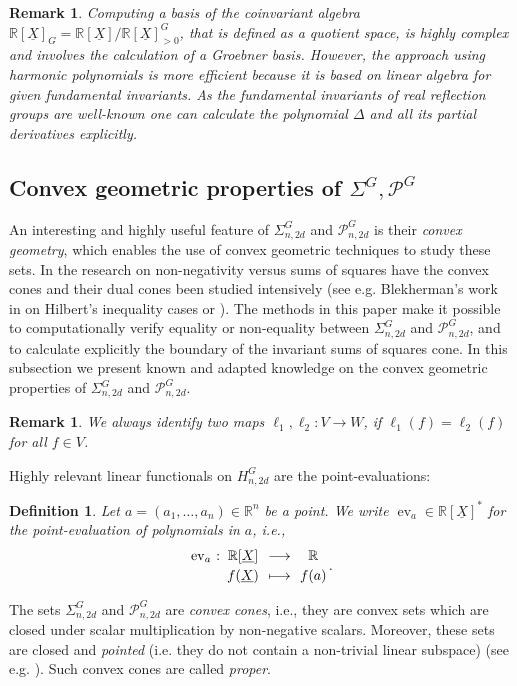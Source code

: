 \documentclass[11pt,a4paper]{amsart}
\newcommand{\abb}[5]{%
\setlength{\arraycolsep}{0.4ex}%
\begin{array}{rcccc}%
#1 &:\,& #2 & \,\,\longrightarrow\,\, & #3 \\[0.5ex]%
     & & #4 & \longmapsto & #5%
\end{array}%
}
\numberwithin{equation}{section}
\newtheorem{definition}[thm]{Definition}
\newtheorem{remark}[thm]{Remark}
\theoremstyle{definition}
\newcommand{\R}{\mathbb{R}}
\DeclareMathOperator{\ev}{ev}
\numberwithin{thm}{section}
\theoremstyle{break}
\numberwithin{subcase}{case}
\begin{document}
\begin{remark}
Computing a basis of the coinvariant algebra $\R[\underline{X}]_G = \R[\underline{X}] / \R[\underline{X}]^G_{> 0}$, that is defined as a quotient space, is highly complex and involves the calculation of a Groebner basis. However, the approach using harmonic polynomials is more efficient because it is based on linear algebra for given fundamental invariants. As the fundamental invariants of real reflection groups are well-known one can calculate the polynomial $\Delta$ and all its partial derivatives explicitly. 
\end{remark}


\subsection{Convex geometric properties of $\Sigma^G, \mathcal{P}^G$}
An interesting and highly useful feature of $\Sigma_{n,2d}^G$ and $\mathcal{P}_{n,2d}^G$ is their \emph{convex geometry}, which enables the use of convex geometric techniques to study these sets. In the research on non-negativity versus sums of squares have the convex cones and their dual cones been studied intensively (see e.g. Blekherman's work in \cite{blekherman2012nonnegative} on Hilbert's inequality cases or \cite{blekherman2012semidefinite}). The methods in this paper make it possible to computationally verify equality or non-equality between $\Sigma_{n,2d}^G$ and $\mathcal{P}_{n,2d}^G$, and to calculate explicitly the boundary of the invariant sums of squares cone. In this subsection we present known and adapted knowledge on the convex geometric properties of $\Sigma_{n,2d}^G$ and $\mathcal{P}_{n,2d}^G$. 

\begin{remark}
We always identify two maps $\ell_1,\ell_2 : V \rightarrow W$, if $\ell_1 (f)= \ell_2 (f)$ for all $f \in V$.
\end{remark}

Highly relevant linear functionals on $H_{n,2d}^G$ are the point-evaluations:
\begin{definition}
Let $a = (a_1,\ldots,a_n) \in \R^n$ be a point. We write $\ev_a \in \R[\underline{X}]^\ast$ for the point-evaluation of polynomials in $a$, i.e., $$\abb{\ev_a}{\R[\underline{X}]}{\R}{f(\underline{X})}{f(a)}.$$ 
\end{definition}


The sets $\Sigma_{n,2d}^G$ and $\mathcal{P}_{n,2d}^G$ are \emph{convex cones}, i.e., they are convex sets which are closed under scalar multiplication by non-negative scalars. Moreover, these sets are closed and \emph{pointed} (i.e. they do not contain a non-trivial linear subspace) (see e.g. \cite{blekherman2006there}). Such convex cones are called \emph{proper}.
\end{document}
